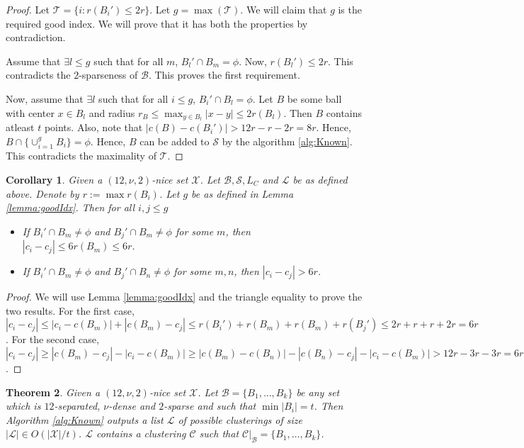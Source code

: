 \documentclass[twoside]{article}
\newcommand{\mc}{\mathcal}
\newtheorem{theorem}{Theorem}
\newtheorem{corollary}[theorem]{Corollary}
\begin{document}
\begin{proof}
Let $\mc T = \{i: r(B_i') \le 2r\}$. Let $g = \max(\mc T)$. We will claim that $g$ is the required good index. We will prove that it has both the properties by contradiction. 

Assume that $\exists l \le g$ such that for all $m$, $B_l' \cap B_m = \phi$. Now, $r(B_l') \le 2r$. This contradicts the $2$-sparseness of $\mc B$. This proves the first requirement.

Now, assume that $\exists l$ such that for all $i \le g$, $B_i' \cap B_l = \phi$. Let $B$ be some ball with center $x \in B_l$ and radius $r_B \le \max_{y \in B_l} |x-y| \le 2r(B_l)$. Then $B$ contains atleast $t$ points. Also, note that $|c(B)-c(B_i')| > 12r - r -2r = 8r$. Hence, $B \cap \{\cup_{i=1}^g B_i\} = \phi$. Hence, $B$ can be added to $\mc S$ by the algorithm \ref{alg:Known}. This contradicts the maximality of $\mc T$.
\end{proof}

\begin{corollary}
Given a $(12,\nu,2)$-nice set $\mc X$. Let $\mc B, \mc S, L_C$ and $\mc L$ be as defined above. Denote by $r := \max r(B_i)$. Let $g$ be as defined in Lemma \ref{lemma:goodIdx}. Then for all $i,j \le g$
\begin{itemize}[nolistsep,noitemsep]
\item If $B_i' \cap B_m \neq \phi$ and $B_j' \cap B_m\neq\phi$ for some $m$, then $|c_i-c_j| \le 6 r(B_m) \le 6r$.
\item If $B_i' \cap B_m \neq \phi$ and $B_j' \cap B_n\neq\phi$ for some $m,n$, then $|c_i-c_j| > 6r$.
\end{itemize}
\label{cor:centerDist}
\end{corollary}

\begin{proof}
We will use Lemma \ref{lemma:goodIdx} and the  triangle equality to prove the two results. For the first case, $|c_i-c_j| \le |c_i-c(B_m)| + |c(B_m)-c_j| \le r(B_i') + r(B_m) + r(B_m) + r(B_j') \le 2r + r + r + 2r = 6r$. For the second case, $|c_i-c_j| \ge  |c(B_m)-c_j| - |c_i-c(B_m)| \ge |c(B_m)-c(B_n)| - |c(B_n) - c_j| - |c_i-c(B_m)| > 12r - 3r -3r = 6r$.
\end{proof}

\begin{theorem}
Given a $(12,\nu,2)$-nice set $\mc X$. Let $\mc B = \{B_1,\ldots,B_k\}$ be any set which is $12$-separated, $\nu$-dense and $2$-sparse and such that $\min |B_i| = t$. Then Algorithm \ref{alg:Known} outputs a list $\mc L$ of possible clusterings of size $|\mc L| \in O(|\mc X|/t)$. $\mc L$ contains a clustering $\mc C$ such that $\mc C|_{\mc B} = \{B_1,\ldots,B_k\}$.
\end{theorem}
\end{document}
